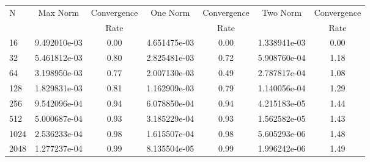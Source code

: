 \documentclass[12pt]{article}
\begin{document}
	\begin{tabular}{l|c|c|c|c|c|c}
		N&Max Norm&Convergence&One Norm&Convergence&Two Norm&Convergence\\
		&&Rate&&Rate&&Rate\\
		\hline
		16&9.492010e-03&0.00&4.651475e-03&0.00&1.338941e-03&0.00\\
		\hline
		32&5.461812e-03&0.80&2.825481e-03&0.72&5.908760e-04&1.18\\
		\hline
		64&3.198950e-03&0.77&2.007130e-03&0.49&2.787817e-04&1.08\\
		\hline
		128&1.829831e-03&0.81&1.162909e-03&0.79&1.140056e-04&1.29\\
		\hline
		256&9.542096e-04&0.94&6.078850e-04&0.94&4.215183e-05&1.44\\
		\hline
		512&5.000687e-04&0.93&3.185229e-04&0.93&1.562582e-05&1.43\\
		\hline
		1024&2.536233e-04&0.98&1.615507e-04&0.98&5.605293e-06&1.48\\
		\hline
		2048&1.277237e-04&0.99&8.135504e-05&0.99&1.996242e-06&1.49\\
	\end{tabular}
\end{document}
